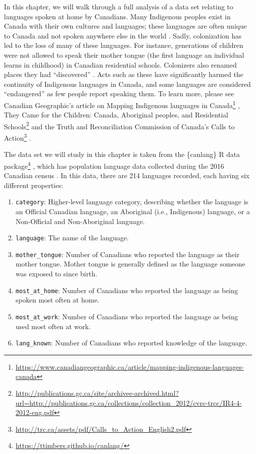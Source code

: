 \documentclass[
  12pt,
]{krantz}
\providecommand{\tightlist}{%
  \setlength{\itemsep}{0pt}\setlength{\parskip}{0pt}}
\renewcommand{\href}[2]{#2\footnote{\url{#1}}}
\begin{document}
In this chapter,  we will walk through a full analysis of a data set relating to
languages spoken at home by Canadians. Many Indigenous peoples exist in Canada
with their own cultures and languages; these languages are often unique to Canada and not spoken
anywhere else in the world \citep{statcan2018mothertongue}. Sadly, colonization has
led to the loss of many of these languages. For instance, generations of
children were not allowed to speak their mother tongue (the first language an
individual learns in childhood) in Canadian residential schools. Colonizers
also renamed places they had ``discovered'' \citep{wilson2018}. Acts such as these
have significantly harmed the continuity of Indigenous languages in Canada, and
some languages are considered ``endangered'' as few people report speaking them.
To learn more, please see Canadian Geographic's article on
\href{https://www.canadiangeographic.ca/article/mapping-indigenous-languages-canada}{Mapping Indigenous languages in Canada}
\citep{walker2017}, \href{http://publications.gc.ca/site/archivee-archived.html?url=http://publications.gc.ca/collections/collection_2012/cvrc-trcc/IR4-4-2012-eng.pdf}{They Came for the Children: Canada, Aboriginal peoples, and Residential Schools} \citep{children2012}
and the Truth and Reconciliation Commission of
Canada's \href{http://trc.ca/assets/pdf/Calls_to_Action_English2.pdf}{Calls to Action} \citep{calls2015}.

The data set we will study in this chapter is taken from
\href{https://ttimbers.github.io/canlang/}{the \{canlang\} R data package} \citep{timbers2020canlang}, which has
population language data collected during the 2016 Canadian census \citep{cancensus2016}.
In this data, there are 214 languages recorded, each having six different properties:

\begin{enumerate}
\def\labelenumi{\arabic{enumi}.}
\tightlist
\item
  \texttt{category}: Higher-level language category, describing whether the language is an Official Canadian language, an Aboriginal (i.e., Indigenous) language, or a Non-Official and Non-Aboriginal language.
\item
  \texttt{language}: The name of the language.
\item
  \texttt{mother\_tongue}: Number of Canadians who reported the language as their mother tongue. Mother tongue is generally defined as the language someone was exposed to since birth.
\item
  \texttt{most\_at\_home}: Number of Canadians who reported the language as being spoken most often at home.
\item
  \texttt{most\_at\_work}: Number of Canadians who reported the language as being used most often at work.
\item
  \texttt{lang\_known}: Number of Canadians who reported knowledge of the language.
\end{enumerate}
\end{document}
